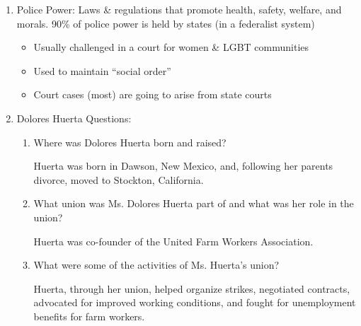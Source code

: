 \documentclass[12pt]{article}
\begin{document}
\begin{enumerate}
  \item Police Power: Laws \& regulations that promote health, safety, welfare, and morals. 90\% of police power is held by states (in a federalist system)

    \begin{itemize}

      \item Usually challenged in a court for women \& LGBT communities

      \item Used to maintain “social order”

      \item Court cases (most) are going to arise from state courts

    \end{itemize}

  \item Dolores Huerta Questions:

    \begin{enumerate}

      \item Where was Dolores Huerta born and raised?

        \begin{justify}

          Huerta was born in Dawson, New Mexico, and, following her parents divorce, moved to Stockton, California.

        \end{justify}

      \item What union was Ms. Dolores Huerta part of and what was her role in the union?

        \begin{justify}

          Huerta was co-founder of the United Farm Workers Association.

        \end{justify}

      \item What were some of the activities of Ms. Huerta's union?

        \begin{justify}

          Huerta, through her union, helped organize strikes, negotiated contracts, advocated for improved working conditions, and fought for unemployment benefits for farm workers.

        \end{justify}


\end{enumerate}
\end{enumerate}
\end{document}
